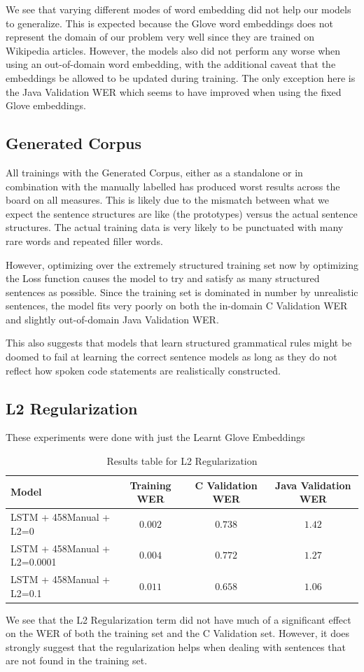 \documentclass[fyp]{socreport}
\begin{document}
We see that varying different modes of word embedding did not help our
models to generalize. This is expected because the Glove word embeddings does
not represent the domain of our problem very well since they are trained
on Wikipedia articles. However, the models also did not perform any worse
when using an out-of-domain word embedding, with the additional caveat that
the embeddings be allowed to be updated during training. The only exception
here is the Java Validation WER which seems to have improved when using the
fixed Glove embeddings.


\subsection{Generated Corpus}
All trainings with the Generated Corpus, either as a standalone or in
combination with the manually labelled has produced worst results across
the board on all measures. This is likely due to the mismatch between
what we expect the sentence structures are like (the prototypes) versus
the actual sentence structures. The actual training data is very likely to
be punctuated with many rare words and repeated filler words.

However, optimizing over the extremely structured training set now by
optimizing the Loss function causes the model to try and satisfy as many
structured sentences as possible. Since the training set is dominated
in number by unrealistic sentences, the model fits very poorly on both
the in-domain C Validation WER and slightly out-of-domain Java Validation
WER.

This also suggests that models that learn structured grammatical rules might be
doomed to fail at learning the correct sentence models as long as they do not
reflect how spoken code statements are realistically constructed.

\subsection{L2 Regularization}

These experiments were done with just the Learnt Glove Embeddings
{
\begin{table}[h!]
\centering
\begin{tabular}{ |p{3cm}||c|c|c| }
    \hline
   Model & Training WER & C Validation WER & Java Validation WER \\
    \hline
    LSTM + 458Manual + L2=0     & $0.002$ & $0.738$ & $1.42$ \\
    \hline
    LSTM + 458Manual + L2=0.0001& $0.004$ & $0.772$ & $1.27$ \\
    \hline
    LSTM + 458Manual + L2=0.1   & $0.011$ & $0.658$ & $1.06$ \\
    \hline
  \end{tabular}
  \caption{Results table for L2 Regularization}
  \label{table:1}
\end{table}

We see that the L2 Regularization term did not have much of a significant effect
on the WER of both the training set and the C Validation set. However, it does
strongly suggest that the regularization helps when dealing with sentences that
are not found in the training set.
}
\end{document}
